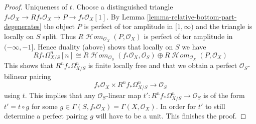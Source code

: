 \documentclass[10pt,a4paper]{amsart}
\theoremstyle{plain}
\theoremstyle{definition}
\theoremstyle{remark}
\numberwithin{equation}{subsection}
\def\SheafHom{\mathop{\mathcal{H}\!\mathit{om}}\nolimits}
\begin{document}
\begin{proof}
\medskip\noindent
Uniqueness of $t$. Choose a distinguished triangle
$f_*\mathcal{O}_X \to Rf_*\mathcal{O}_X \to P \to f_*\mathcal{O}_X[1]$.
By Lemma \ref{lemma-relative-bottom-part-degenerates}
the object $P$ is perfect of tor amplitude in $[1, \infty)$
and the triangle is locally on $S$ split.
Thus $R\SheafHom_{\mathcal{O}_X}(P, \mathcal{O}_X)$ is perfect
of tor amplitude in $(-\infty, -1]$. Hence duality (above) shows that
locally on $S$ we have
$$
Rf_*\Omega^n_{X/S}[n] \cong
R\SheafHom_{\mathcal{O}_S}(f_*\mathcal{O}_X, \mathcal{O}_S)
\oplus R\SheafHom_{\mathcal{O}_X}(P, \mathcal{O}_X)
$$
This shows that $R^nf_*\Omega^n_{X/S}$ is finite locally free and
that we obtain a perfect $\mathcal{O}_S$-bilinear pairing
$$
f_*\mathcal{O}_X \times R^nf_*\Omega^n_{X/S} \longrightarrow \mathcal{O}_S
$$
using $t$.
This implies that any $\mathcal{O}_S$-linear map
$t' : R^nf_*\Omega^n_{X/S} \to \mathcal{O}_S$ is of the form
$t' = t \circ g$ for some
$g \in \Gamma(S, f_*\mathcal{O}_X) = \Gamma(X, \mathcal{O}_X)$.
In order for $t'$ to still determine a perfect pairing $g$ will have
to be a unit. This finishes the proof.
\end{proof}
\end{document}
